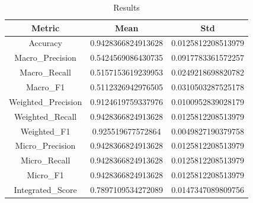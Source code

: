 \begin{table}[htbp]
\centering
\caption{Results}
\label{tab:csv}
\small
\setlength{\tabcolsep}{4pt}
\begin{tabular}{|c|c|c|}
\hline
Metric & Mean & Std \\
\hline
Accuracy & 0.9428366824913628 & 0.0125812208513979 \\
Macro_Precision & 0.5424569086430735 & 0.0917783361572257 \\
Macro_Recall & 0.5157153619239953 & 0.0249218698820782 \\
Macro_F1 & 0.5112326942976505 & 0.0310503287525178 \\
Weighted_Precision & 0.9124619759337976 & 0.0100952839028179 \\
Weighted_Recall & 0.9428366824913628 & 0.0125812208513979 \\
Weighted_F1 & 0.925519677572864 & 0.0049827190379758 \\
Micro_Precision & 0.9428366824913628 & 0.0125812208513979 \\
Micro_Recall & 0.9428366824913628 & 0.0125812208513979 \\
Micro_F1 & 0.9428366824913628 & 0.0125812208513979 \\
Integrated_Score & 0.7897109534272089 & 0.0147347089809756 \\
\hline
\end{tabular}
\end{table}